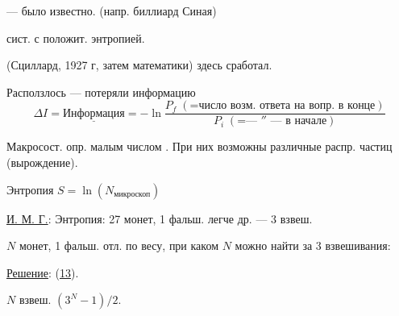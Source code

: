 --- было известно. (напр. биллиард Синая)

сист. с положит. энтропией.

 (Сциллард, 1927 г, затем математики) здесь сработал.

Расползлось --- потеряли информацию
\[
\Delta I=\underline{\text{Информация}}=-\ln
\frac{P_f\;(\mathord{=}\text{число возм. ответа на вопр. в конце})}
{P_i\;(\mathord{=}\text{--- ″ --- в начале})}
\]


Макросост. опр. малым числом . При них возможны различные распр. частиц (вырождение).

Энтропия \(S=\ln(N_{\text{микроскоп}})\)

\underline{И. М. Г.}: Энтропия: 27 монет, 1 фальш. легче др. --- 3 взвеш.

\(N\) монет, 1 фальш. отл. по весу, при каком \(N\) можно найти за 3 взвешивания:

\underline{Решение}:  (\underline{\underline{13}}).

\(N\) взвеш. \((3^N-1)/2\).



